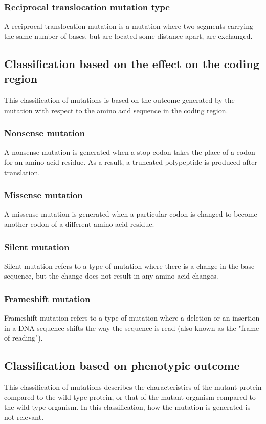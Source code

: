 \documentclass[11pt]{article}
\begin{document}
\subsubsection{Reciprocal translocation mutation type}
\label{sec:org4fa88aa}
A reciprocal translocation mutation is a mutation where two segments carrying the same number of bases, but are located some distance apart, are exchanged.

\newpage
\subsection{Classification based on the effect on the coding region}
\label{sec:org115f768}
This classification of mutations is based on the outcome generated by the mutation with respect to the amino acid sequence in the coding region.
\subsubsection{Nonsense mutation}
\label{sec:orgc81f304}
A nonsense mutation is generated when a stop codon takes the place of a codon for an amino acid residue. As a result, a truncated polypeptide is produced after translation.
\subsubsection{Missense mutation}
\label{sec:org184d8d4}
A missense mutation is generated when a particular codon is changed to become another codon of a different amino acid residue.
\subsubsection{Silent mutation}
\label{sec:orgeda2f65}
Silent mutation refers to a type of mutation where there is a change in the base sequence, but the change does not result in any amino acid changes.
\subsubsection{Frameshift mutation}
\label{sec:org9e1dd80}
Frameshift mutation refers to a type of mutation where a deletion or an insertion in a DNA sequence shifts the way the sequence is read (also known as the "frame of reading").

\newpage
\subsection{Classification based on phenotypic outcome}
\label{sec:orgbe19276}
This classification of mutations describes the characteristics of the mutant protein compared to the wild type protein, or that of the mutant organism compared to the wild type organism. In this classification, how the mutation is generated is not relevant.
\end{document}
